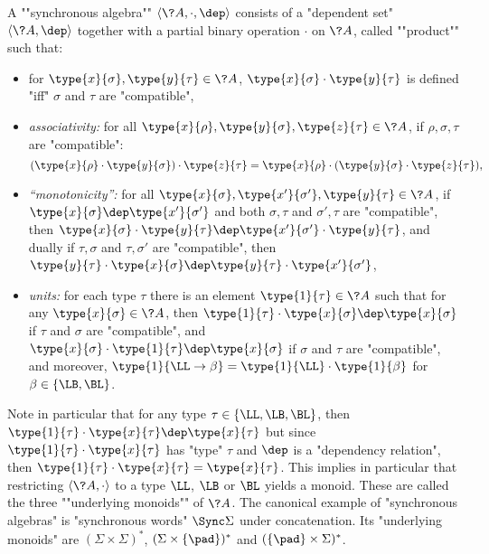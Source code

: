 \begin{definition}
	\label{def:synchronous-algebra}
	A \AP""synchronous algebra"" $\langle \?A, \cdot, \dep \rangle$ consists of a "dependent set" $\langle \?A, \dep \rangle$ together
	with a partial binary operation $\cdot$ on $\?A$, called \AP""product"" such that:
	\begin{itemize}
		\item for $\type{x}{\sigma}, \type{y}{\tau} \in \?A$,
			$\type{x}{\sigma} \cdot \type{y}{\tau}$ is defined "iff" $\sigma$ and $\tau$
			are "compatible",
		\item \emph{associativity:} for all $\type{x}{\rho}, \type{y}{\sigma}, \type{z}{\tau} \in \?A$, if $\rho, \sigma, \tau$ are "compatible":
		\[
			(\type{x}{\rho} \cdot \type{y}{\sigma}) \cdot \type{z}{\tau} 
			= \type{x}{\rho} \cdot (\type{y}{\sigma} \cdot \type{z}{\tau}),
		\]
		\item \emph{``monotonicity'':} for all $\type{x}{\sigma}, \type{x'}{\sigma'}, \type{y}{\tau} \in \?A$, if $\type{x}{\sigma} \dep \type{x'}{\sigma'}$ and
		both $\sigma,\tau$ and $\sigma', \tau$ are "compatible", then
		$\type{x}{\sigma}\cdot \type{y}{\tau} \dep \type{x'}{\sigma'}\cdot \type{y}{\tau}$,
		and dually if $\tau,\sigma$ and $\tau, \sigma'$ are "compatible", then 
		$\type{y}{\tau}\cdot \type{x}{\sigma} \dep \type{y}{\tau}\cdot \type{x'}{\sigma'}$,
		\item \emph{units:} for each type $\tau$ there is an element $\type{1}{\tau} \in \?A$ 
			such that for any $\type{x}{\sigma} \in \?A$, then
			$\type{1}{\tau} \cdot \type{x}{\sigma} \dep \type{x}{\sigma}$
			if $\tau$ and $\sigma$ are "compatible",
			and $\type{x}{\sigma} \cdot \type{1}{\tau} \dep \type{x}{\sigma}$
			if $\sigma$ and $\tau$ are "compatible",
			and moreover, $\type{1}{\LL\to\beta} = \type{1}{\LL}\cdot \type{1}{\beta}$
			for $\beta \in \{\LB,\BL\}$.
	\end{itemize}
\end{definition}

Note in particular that for any type $\tau \in \{\LL,\LB,\BL\}$,
then $\type{1}{\tau} \cdot \type{x}{\tau} \dep \type{x}{\tau}$
but since $\type{1}{\tau} \cdot \type{x}{\tau}$ has "type" $\tau$ and $\dep$ is a
"dependency relation", then $\type{1}{\tau} \cdot \type{x}{\tau} = \type{x}{\tau}$.
This implies in particular that restricting $\langle \?A, \cdot \rangle$
to a type $\LL$, $\LB$ or $\BL$ yields a monoid.
These are called the three \AP""underlying monoids"" of $\?A$.
The canonical example of "synchronous algebras" is "synchronous words" $\Sync\Sigma$ under 
concatenation. Its "underlying monoids" are $(\Sigma\times\Sigma)^*$,
$(\Sigma\times\{\pad\})^*$ and $(\{\pad\}\times\Sigma)^*$.

